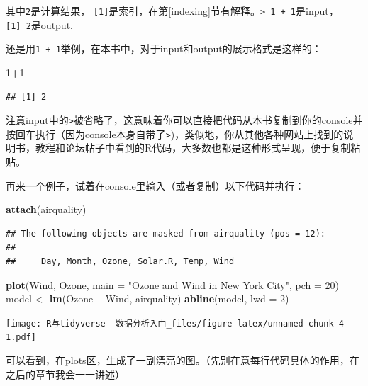 \documentclass[]{book}
\newenvironment{Shaded}{\begin{snugshade}}{\end{snugshade}}
\newcommand{\DataTypeTok}[1]{\textcolor[rgb]{0.13,0.29,0.53}{#1}}
\newcommand{\DecValTok}[1]{\textcolor[rgb]{0.00,0.00,0.81}{#1}}
\newcommand{\KeywordTok}[1]{\textcolor[rgb]{0.13,0.29,0.53}{\textbf{#1}}}
\newcommand{\NormalTok}[1]{#1}
\newcommand{\OperatorTok}[1]{\textcolor[rgb]{0.81,0.36,0.00}{\textbf{#1}}}
\newcommand{\StringTok}[1]{\textcolor[rgb]{0.31,0.60,0.02}{#1}}
\begin{document}
其中\texttt{2}是计算结果， \texttt{{[}1{]}}是索引，在第\ref{indexing}节有解释。\texttt{\textgreater{}\ 1\ +\ 1}是input，\texttt{{[}1{]}\ 2}是output.

还是用\texttt{1\ +\ 1}举例，在本书中，对于input和output的展示格式是这样的：

\begin{Shaded}
\begin{Highlighting}[]
\DecValTok{1}\OperatorTok{+}\DecValTok{1}
\end{Highlighting}
\end{Shaded}

\begin{verbatim}
## [1] 2
\end{verbatim}

注意input中的\texttt{\textgreater{}}被省略了，这意味着你可以直接把代码从本书复制到你的console并按回车执行（因为console本身自带了\texttt{\textgreater{}})，类似地，你从其他各种网站上找到的说明书，教程和论坛帖子中看到的R代码，大多数也都是这种形式呈现，便于复制粘贴。

再来一个例子，试着在console里输入（或者复制）以下代码并执行：

\begin{Shaded}
\begin{Highlighting}[]
\KeywordTok{attach}\NormalTok{(airquality)}
\end{Highlighting}
\end{Shaded}

\begin{verbatim}
## The following objects are masked from airquality (pos = 12):
## 
##     Day, Month, Ozone, Solar.R, Temp, Wind
\end{verbatim}

\begin{Shaded}
\begin{Highlighting}[]
\KeywordTok{plot}\NormalTok{(Wind, Ozone, }\DataTypeTok{main =} \StringTok{"Ozone and Wind in New York City"}\NormalTok{, }\DataTypeTok{pch =} \DecValTok{20}\NormalTok{)}
\NormalTok{model <-}\StringTok{ }\KeywordTok{lm}\NormalTok{(Ozone }\OperatorTok{~}\StringTok{ }\NormalTok{Wind, airquality)}
\KeywordTok{abline}\NormalTok{(model, }\DataTypeTok{lwd =} \DecValTok{2}\NormalTok{)}
\end{Highlighting}
\end{Shaded}

\texttt{[image: R与tidyverse——数据分析入门\_files/figure-latex/unnamed-chunk-4-1.pdf]}

可以看到，在plots区，生成了一副漂亮的图。（先别在意每行代码具体的作用，在之后的章节我会一一讲述）
\end{document}
